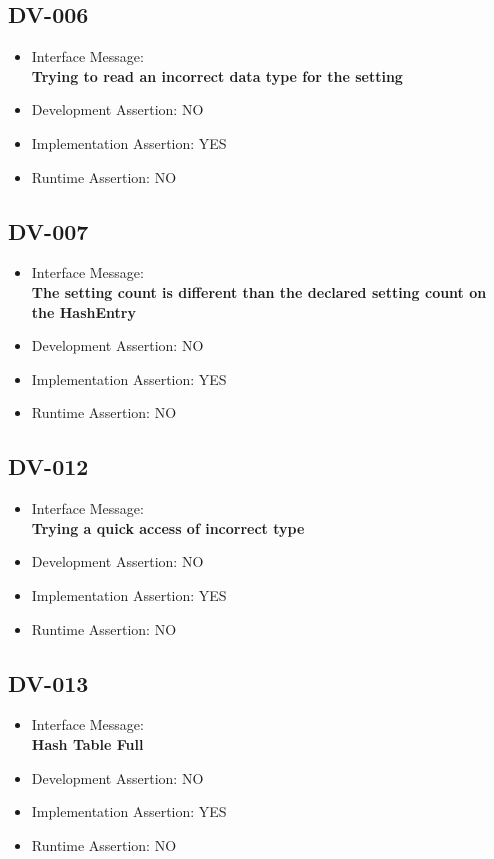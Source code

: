 \subsection{DV-006}
\begin{itemize}
  \item Interface Message:\\[1em]\textbf{Trying to read an incorrect data type for the setting}
  \item Development Assertion: NO
  \item Implementation Assertion: YES
  \item Runtime Assertion: NO
\end{itemize}

\subsection{DV-007}
\begin{itemize}
  \item Interface Message:\\[1em]\textbf{The setting count is different than the declared setting count on the HashEntry}
  \item Development Assertion: NO
  \item Implementation Assertion: YES
  \item Runtime Assertion: NO
\end{itemize}

\subsection{DV-012}
\begin{itemize}
  \item Interface Message:\\[1em]\textbf{Trying a quick access of incorrect type}
  \item Development Assertion: NO
  \item Implementation Assertion: YES
  \item Runtime Assertion: NO
\end{itemize}

\subsection{DV-013}
\begin{itemize}
  \item Interface Message:\\[1em]\textbf{Hash Table Full}
  \item Development Assertion: NO
  \item Implementation Assertion: YES
  \item Runtime Assertion: NO
\end{itemize}

